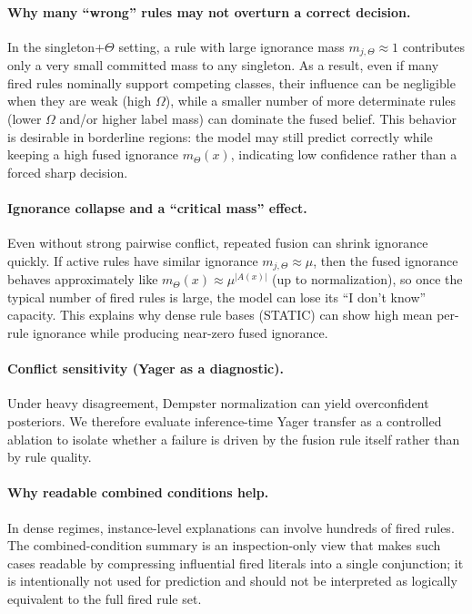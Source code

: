 \documentclass[11pt,a4paper]{article}
\providecommand{\1}{}
\renewcommand{\1}{\mathbbm{1}}
\begin{document}
\paragraph{Why many ``wrong'' rules may not overturn a correct decision.}
In the singleton+$\Theta$ setting, a rule with large ignorance mass $m_{j,\Theta}\approx 1$ contributes only a very small committed mass to any singleton.
As a result, even if many fired rules nominally support competing classes, their influence can be negligible when they are weak (high $\Omega$), while a smaller number of more determinate rules (lower $\Omega$ and/or higher label mass) can dominate the fused belief.
This behavior is desirable in borderline regions: the model may still predict correctly while keeping a high fused ignorance $m_\Theta(x)$, indicating low confidence rather than a forced sharp decision.

\paragraph{Ignorance collapse and a ``critical mass'' effect.}
Even without strong pairwise conflict, repeated fusion can shrink ignorance quickly.
If active rules have similar ignorance $m_{j,\Theta}\approx \mu$, then the fused ignorance behaves approximately like $m_\Theta(x)\approx \mu^{|A(x)|}$ (up to normalization), so once the typical number of fired rules is large, the model can lose its ``I don't know'' capacity.
This explains why dense rule bases (STATIC) can show high mean per-rule ignorance while producing near-zero fused ignorance.

\paragraph{Conflict sensitivity (Yager as a diagnostic).}
Under heavy disagreement, Dempster normalization can yield overconfident posteriors.
We therefore evaluate inference-time Yager transfer as a controlled ablation to isolate whether a failure is driven by the fusion rule itself rather than by rule quality.

\paragraph{Why readable combined conditions help.}
In dense regimes, instance-level explanations can involve hundreds of fired rules.
The combined-condition summary is an inspection-only view that makes such cases readable by compressing influential fired literals into a single conjunction; it is intentionally not used for prediction and should not be interpreted as logically equivalent to the full fired rule set.
\end{document}

